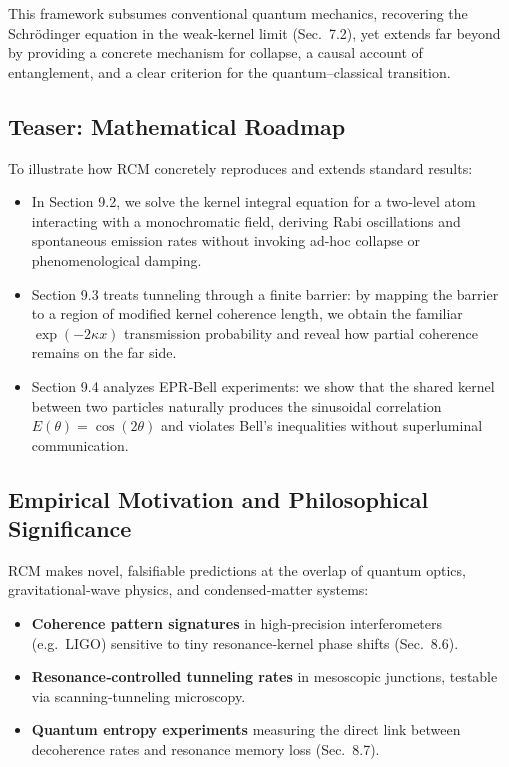 This framework subsumes conventional quantum mechanics, recovering the Schrödinger equation in the weak‐kernel limit (Sec.~7.2), yet extends far beyond by providing a concrete mechanism for collapse, a causal account of entanglement, and a clear criterion for the quantum–classical transition.

\subsection{Teaser: Mathematical Roadmap}

To illustrate how RCM concretely reproduces and extends standard results:

\begin{itemize}
  \item In Section 9.2, we solve the kernel integral equation for a two‐level atom interacting with a monochromatic field, deriving Rabi oscillations and spontaneous emission rates without invoking ad-hoc collapse or phenomenological damping.  
  \item Section 9.3 treats tunneling through a finite barrier: by mapping the barrier to a region of modified kernel coherence length, we obtain the familiar \(\exp(-2\kappa x)\) transmission probability and reveal how partial coherence remains on the far side.
  \item Section 9.4 analyzes EPR‐Bell experiments: we show that the shared kernel between two particles naturally produces the sinusoidal correlation \(E(\theta)=\cos(2\theta)\) and violates Bell’s inequalities without superluminal communication.
\end{itemize}

\subsection{Empirical Motivation and Philosophical Significance}

RCM makes novel, falsifiable predictions at the overlap of quantum optics, gravitational‐wave physics, and condensed‐matter systems:

\begin{itemize}
  \item \textbf{Coherence pattern signatures} in high‐precision interferometers (e.g.\ LIGO) sensitive to tiny resonance‐kernel phase shifts (Sec.~8.6).  
  \item \textbf{Resonance‐controlled tunneling rates} in mesoscopic junctions, testable via scanning‐tunneling microscopy.  
  \item \textbf{Quantum entropy experiments} measuring the direct link between decoherence rates and resonance memory loss (Sec.~8.7).
\end{itemize}

